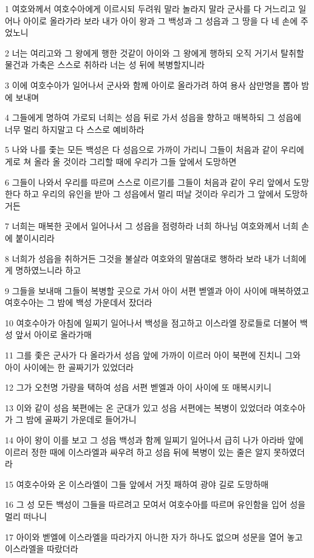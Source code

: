 \par 1 여호와께서 여호수아에게 이르시되 두려워 말라 놀라지 말라 군사를 다 거느리고 일어나 아이로 올라가라 보라 내가 아이 왕과 그 백성과 그 성읍과 그 땅을 다 네 손에 주었노니
\par 2 너는 여리고와 그 왕에게 행한 것같이 아이와 그 왕에게 행하되 오직 거기서 탈취할 물건과 가축은 스스로 취하라 너는 성 뒤에 복병할지니라
\par 3 이에 여호수아가 일어나서 군사와 함께 아이로 올라가려 하여 용사 삼만명을 뽑아 밤에 보내며
\par 4 그들에게 명하여 가로되 너희는 성읍 뒤로 가서 성읍을 향하고 매복하되 그 성읍에 너무 멀리 하지말고 다 스스로 예비하라
\par 5 나와 나를 좇는 모든 백성은 다 성읍으로 가까이 가리니 그들이 처음과 같이 우리에게로 쳐 올라 올 것이라 그리할 때에 우리가 그들 앞에서 도망하면
\par 6 그들이 나와서 우리를 따르며 스스로 이르기를 그들이 처음과 같이 우리 앞에서 도망한다 하고 우리의 유인을 받아 그 성읍에서 멀리 떠날 것이라 우리가 그 앞에서 도망하거든
\par 7 너희는 매복한 곳에서 일어나서 그 성읍을 점령하라 너희 하나님 여호와께서 너희 손에 붙이시리라
\par 8 너희가 성읍을 취하거든 그것을 불살라 여호와의 말씀대로 행하라 보라 내가 너희에게 명하였느니라 하고
\par 9 그들을 보내매 그들이 복병할 곳으로 가서 아이 서편 벧엘과 아이 사이에 매복하였고 여호수아는 그 밤에 백성 가운데서 잤더라
\par 10 여호수아가 아침에 일찌기 일어나서 백성을 점고하고 이스라엘 장로들로 더불어 백성 앞서 아이로 올라가매
\par 11 그를 좇은 군사가 다 올라가서 성읍 앞에 가까이 이르러 아이 북편에 진치니 그와 아이 사이에는 한 골짜기가 있었더라
\par 12 그가 오천명 가량을 택하여 성읍 서편 벧엘과 아이 사이에 또 매복시키니
\par 13 이와 같이 성읍 북편에는 온 군대가 있고 성읍 서편에는 복병이 있었더라 여호수아가 그 밤에 골짜기 가운데로 들어가니
\par 14 아이 왕이 이를 보고 그 성읍 백성과 함께 일찌기 일어나서 급히 나가 아라바 앞에 이르러 정한 때에 이스라엘과 싸우려 하고 성읍 뒤에 복병이 있는 줄은 알지 못하였더라
\par 15 여호수아와 온 이스라엘이 그들 앞에서 거짓 패하여 광야 길로 도망하매
\par 16 그 성 모든 백성이 그들을 따르려고 모여서 여호수아를 따르며 유인함을 입어 성을 멀리 떠나니
\par 17 아이와 벧엘에 이스라엘을 따라가지 아니한 자가 하나도 없으며 성문을 열어 놓고 이스라엘을 따랐더라
